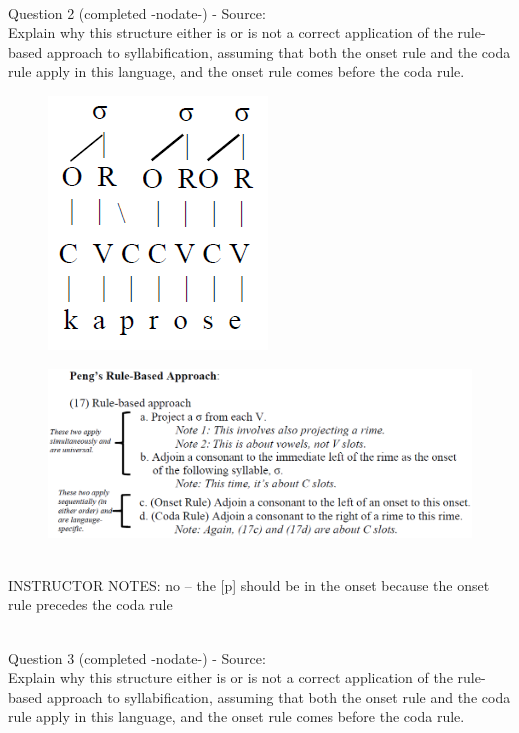 \documentclass[12pt]{article}
\begin{document}
~\\

{\large Question 2} (completed -nodate-) - Source: \\

Explain why this structure either is or is not a correct application of the rule-based approach to syllabification, assuming that both the onset rule and the coda rule apply in this language, and the onset rule comes before the coda rule.\\

\begin{figure}[H]
\includegraphics{../images/pengrules_kaprose_no.png}
\end{figure}
\begin{figure}[H]
\includegraphics{../images/peng_rules.png}
\end{figure}

~\\
INSTRUCTOR NOTES: no -- the [p] should be in the onset because the onset rule precedes the coda rule


~\\

{\large Question 3} (completed -nodate-) - Source: \\

Explain why this structure either is or is not a correct application of the rule-based approach to syllabification, assuming that both the onset rule and the coda rule apply in this language, and the onset rule comes before the coda rule.\\
\end{document}
